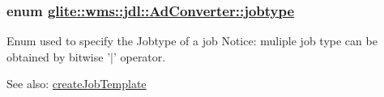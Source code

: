 \hypertarget{classglite_1_1wms_1_1jdl_1_1AdConverter_w9}{
\subsubsection[jobtype]{\setlength{\rightskip}{0pt plus 5cm}enum \hyperlink{classglite_1_1wms_1_1jdl_1_1AdConverter_w9}{glite::wms::jdl::Ad\-Converter::jobtype}}}
\label{classglite_1_1wms_1_1jdl_1_1AdConverter_w9}


Enum used to specify the Jobtype of a job Notice: muliple job type can be obtained by bitwise '$|$' operator. \begin{Desc}
\item[See also:]\hyperlink{classglite_1_1wms_1_1jdl_1_1AdConverter_z21_0}{create\-Job\-Template} \end{Desc}
